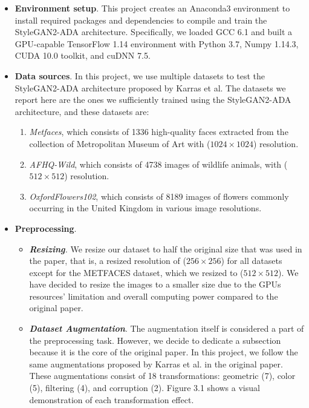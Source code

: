 \documentclass{report}
\begin{document}
\begin{itemize}
\item\textbf{Environment setup}. This project creates an Anaconda3 environment to install required packages and dependencies to compile and train the StyleGAN2-ADA architecture. Specifically, we loaded GCC 6.1 and built a GPU-capable TensorFlow 1.14 environment with Python 3.7, Numpy 1.14.3, CUDA 10.0 toolkit, and cuDNN 7.5.

\item \textbf{Data sources}. In this project, we use multiple datasets to test the StyleGAN2-ADA architecture proposed by Karras et al. The datasets we report here are the ones we sufficiently trained using the StyleGAN2-ADA architecture, and these datasets are: 
 \begin{enumerate}
 \item \textit{Metfaces}, which consists of 1336 high-quality faces extracted from the collection of Metropolitan Museum of Art with ($1024 \times 1024$) resolution. 
 \item \textit{AFHQ-Wild}, which consists of 4738 images of wildlife animals, with ($512 \times 512$) resolution.
  \item \textit{OxfordFlowers102}, which consists of 8189 images of flowers commonly occurring in the United Kingdom in various image resolutions.
   \end{enumerate}

\item \textbf{Preprocessing}. 
\begin{itemize}

\item \textit{\textbf{Resizing}.} We resize our dataset to half the original size that was used in the paper, that is, a resized resolution of ($256 \times 256$) for all datasets except for the METFACES dataset, which we resized to ($512 \times 512$). We have decided to resize the images to a smaller size due to the GPUs resources' limitation and overall computing power compared to the original paper.

\item \textbf{\textit{Dataset Augmentation}}. The augmentation itself is considered a part of the preprocessing task. However, we decide to dedicate a subsection because it is the core of the original paper. In this project, we follow the same augmentations proposed by Karras et al. in the original paper. These augmentations consist of 18 transformations: geometric (7), color (5), filtering (4), and corruption (2). Figure 3.1 shows a visual demonstration of each transformation effect.


\end{itemize}
\end{itemize}
\end{document}
